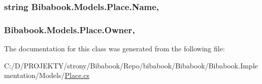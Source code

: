 \subsubsection[{Name}]{\setlength{\rightskip}{0pt plus 5cm}string Bibabook.\+Models.\+Place.\+Name\hspace{0.3cm}{\ttfamily [get]}, {\ttfamily [set]}}\label{class_bibabook_1_1_models_1_1_place_a204d1e81dc31a7c79513700b5fae0f93}
\hypertarget{class_bibabook_1_1_models_1_1_place_a0933e1aeb5aac0f402eb0025e2404632}{}
\subsubsection[{Owner}]{ Bibabook.\+Models.\+Place.\+Owner\hspace{0.3cm}{\ttfamily [get]}, {\ttfamily [set]}}\label{class_bibabook_1_1_models_1_1_place_a0933e1aeb5aac0f402eb0025e2404632}


The documentation for this class was generated from the following file\+:\begin{DoxyCompactItemize}
\item 
C\+:/\+D/\+P\+R\+O\+J\+E\+K\+T\+Y/strony/\+Bibabook/\+Repo/bibabook/\+Bibabook/\+Bibabook.\+Implementation/\+Models/\hyperlink{_place_8cs}{Place.\+cs}\end{DoxyCompactItemize}
